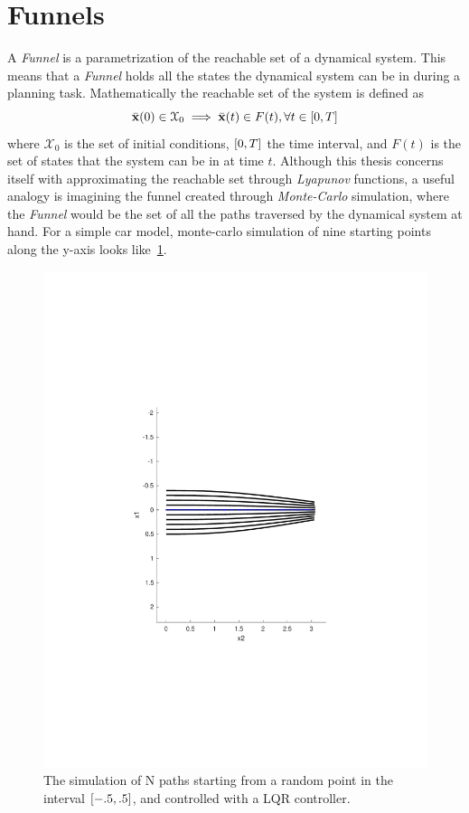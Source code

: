 \section{Funnels}

A \textit{Funnel} is a parametrization of the reachable set of a dynamical
system. This means that a \textit{Funnel} holds all the states the dynamical
system can be in during a planning task. Mathematically the reachable set of the
system is defined as
\[
  \bar{\mathbf{x}}(0) \in \mathcal{X}_0 \implies \bar{\mathbf{x}}(t) \in F(t),
  \forall t \in \lbrack0,T\rbrack
\]
where \(\mathcal{X}_0\) is the set of initial conditions, \(\lbrack0,T\rbrack\) the time
interval, and \(F(t)\) is the set of states that the system can be in at time
\(t\). Although this thesis concerns itself with approximating the reachable set
through \textit{Lyapunov} functions, a useful analogy is imagining the funnel
created through \textit{Monte-Carlo} simulation, where the \textit{Funnel} would
be the set of all the paths traversed by the dynamical system at hand. For a
simple car model, monte-carlo simulation of nine starting points along the
y-axis looks like~\cref{fig:monte-carlo-sim}.

\begin{figure}
  \centering \includegraphics[scale=.5]{figures/preliminaries/montecarlofunnel}
  \caption{The simulation of N paths starting from a random point in the
    interval \(\lbrack-.5,.5\rbrack\), and controlled with a LQR controller.}
  \label{fig:monte-carlo-sim}
\end{figure}

